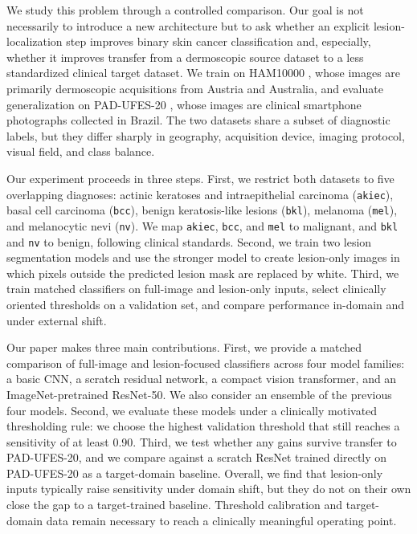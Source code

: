 \documentclass[10pt]{article}
\begin{document}
We study this problem through a controlled comparison. Our goal is not necessarily to introduce a new architecture but to ask whether an explicit lesion-localization step improves binary skin cancer classification and, especially, whether it improves transfer from a dermoscopic source dataset to a less standardized clinical target dataset. We train on HAM10000 \cite{tschandl2018ham10000}, whose images are primarily dermoscopic acquisitions from Austria and Australia, and evaluate generalization on PAD-UFES-20 \cite{pacheco2020padufes20}, whose images are clinical smartphone photographs collected in Brazil. The two datasets share a subset of diagnostic labels, but they differ sharply in geography, acquisition device, imaging protocol, visual field, and class balance.

Our experiment proceeds in three steps. First, we restrict both datasets to five overlapping diagnoses: actinic keratoses and intraepithelial carcinoma (\texttt{akiec}), basal cell carcinoma (\texttt{bcc}), benign keratosis-like lesions (\texttt{bkl}), melanoma (\texttt{mel}), and melanocytic nevi (\texttt{nv}). We map \texttt{akiec}, \texttt{bcc}, and \texttt{mel} to malignant, and \texttt{bkl} and \texttt{nv} to benign, following clinical standards. Second, we train two lesion segmentation models and use the stronger model to create lesion-only images in which pixels outside the predicted lesion mask are replaced by white. Third, we train matched classifiers on full-image and lesion-only inputs, select clinically oriented thresholds on a validation set, and compare performance in-domain and under external shift.

Our paper makes three main contributions. First, we provide a matched comparison of full-image and lesion-focused classifiers across four model families: a basic CNN, a scratch residual network, a compact vision transformer, and an ImageNet-pretrained ResNet-50. We also consider an ensemble of the previous four models. Second, we evaluate these models under a clinically motivated thresholding rule: we choose the highest validation threshold that still reaches a sensitivity of at least 0.90. Third, we test whether any gains survive transfer to PAD-UFES-20, and we compare against a scratch ResNet trained directly on PAD-UFES-20 as a target-domain baseline. Overall, we find that lesion-only inputs typically raise sensitivity under domain shift, but they do not on their own close the gap to a target-trained baseline. Threshold calibration and target-domain data remain necessary to reach a clinically meaningful operating point.
\end{document}
